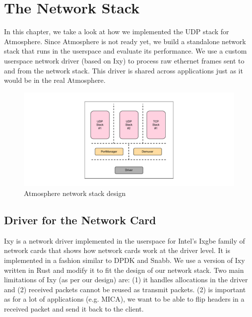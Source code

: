 \chapter{The Network Stack} %

\label{Chapter4} %


In this chapter, we take a look at how we implemented the UDP stack for Atmosphere. Since Atmosphere is not ready yet, we build a standalone network stack that runs in the userspace and evaluate its performance. We use a custom userspace network driver (based on Ixy) to process raw ethernet frames sent to and from the network stack. This driver is shared across applications just as it would be in the real Atmosphere.

\begin{figure}[!htbp]
	\includegraphics[width=1.0\columnwidth]{figures/network-design.pdf}
\caption{Atmosphere network stack design}
	\label{fig:network-design}
\end{figure}

\section{Driver for the Network Card}

Ixy is a network driver implemented in the userspace for Intel's Ixgbe family of network cards that shows how network cards work at the driver level. It is implemented in a fashion similar to DPDK and Snabb. We use a version of Ixy written in Rust and modify it to fit the design of our network stack. Two main limitations of Ixy (as per our design) are: (1) it handles allocations in the driver and (2) received packets cannot be reused as transmit packets. (2) is important as for a lot of applications (e.g. MICA), we want to be able to flip headers in a received packet and send it back to the client. 

